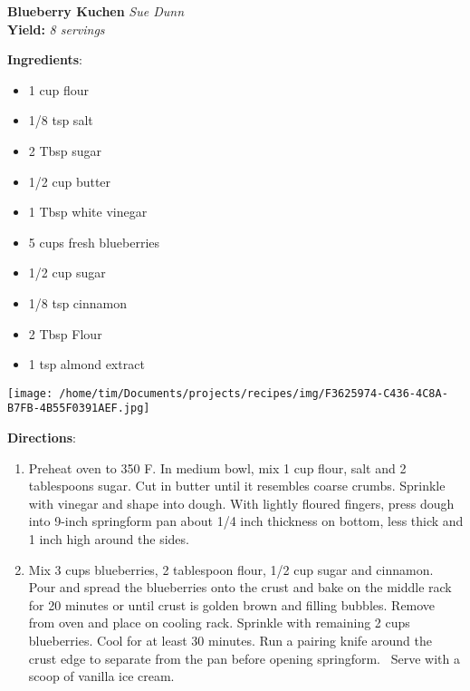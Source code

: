 \documentclass[11pt, twoside, openany]{book}
\begin{document}
\noindent\begin{minipage}[t]{\linewidth}%
{\Large\textbf{Blueberry Kuchen}} \label{blueberry-kuchen}\hfill\textit{Sue Dunn}\\
\textbf{Yield:} \textit{8 servings}\\
\noindent\begin{minipage}[t]{0.78\linewidth}%
\textbf{Ingredients}:\vspace{-3mm}
\begin{multicols}{2}
\begin{itemize}\setlength\itemsep{-1mm}
\item 1 cup flour
\item 1/8 tsp salt
\item 2 Tbsp sugar
\item 1/2 cup butter
\item 1 Tbsp white vinegar
\item 5 cups fresh blueberries
\item 1/2 cup sugar
\item 1/8 tsp cinnamon
\item 2 Tbsp Flour
\item 1 tsp almond extract
\end{itemize}
\end{multicols}
\end{minipage}
\noindent\begin{minipage}[t]{0.18\linewidth}
\centering \strut\vspace*{-\baselineskip}\newline
\texttt{[image: /home/tim/Documents/projects/recipes/img/F3625974-C436-4C8A-B7FB-4B55F0391AEF.jpg]}\\
\end{minipage}\vspace{3mm}
\textbf{Directions}:
\vspace{-3mm}\begin{enumerate}\setlength\itemsep{-1mm}
\item Preheat oven to 350 F. In medium bowl, mix 1 cup flour, salt and 2 tablespoons sugar. Cut in butter until it resembles coarse crumbs. Sprinkle with vinegar and shape into dough. With lightly floured fingers, press dough into 9-inch springform pan about 1/4 inch thickness on bottom, less thick and 1 inch high around the sides.
\item Mix 3 cups blueberries, 2 tablespoon flour, 1/2 cup sugar and cinnamon. Pour and spread the blueberries onto the crust and bake on the middle rack for 20 minutes or until crust is golden brown and filling bubbles. Remove from oven and place on cooling rack. Sprinkle with remaining 2 cups blueberries. Cool for at least 30 minutes. Run a pairing knife around the crust edge to separate from the pan before opening springform.  Serve with a scoop of vanilla ice cream.
\end{enumerate}
\end{minipage}\vspace{8mm}
\end{document}
